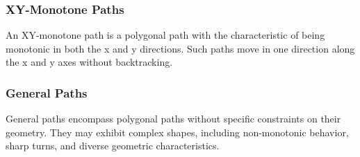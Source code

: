 \subsubsection{XY-Monotone Paths}

An XY-monotone path is a polygonal path with the characteristic of being monotonic in both the x and y directions. Such paths move in one direction along the x and y axes without backtracking.

\subsubsection{General Paths}

General paths encompass polygonal paths without specific constraints on their geometry. They may exhibit complex shapes, including non-monotonic behavior, sharp turns, and diverse geometric characteristics.

\fi
